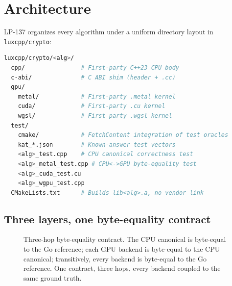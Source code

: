 \section{Architecture}
\label{sec:architecture}

LP-137 organizes every algorithm under a uniform directory layout in \texttt{luxcpp/crypto}:

\begin{lstlisting}[language=bash,caption={Per-algorithm directory layout}]
luxcpp/crypto/<alg>/
  cpp/                # First-party C++23 CPU body
  c-abi/              # C ABI shim (header + .cc)
  gpu/
    metal/            # First-party .metal kernel
    cuda/             # First-party .cu kernel
    wgsl/             # First-party .wgsl kernel
  test/
    cmake/            # FetchContent integration of test oracles
    kat_*.json        # Known-answer test vectors
    <alg>_test.cpp    # CPU canonical correctness test
    <alg>_metal_test.cpp # CPU<->GPU byte-equality test
    <alg>_cuda_test.cu
    <alg>_wgpu_test.cpp
  CMakeLists.txt      # Builds lib<alg>.a, no vendor link
\end{lstlisting}

\subsection{Three layers, one byte-equality contract}

\begin{figure}[H]
\centering
{}
\caption{Three-hop byte-equality contract. The CPU canonical is byte-equal to the Go reference; each GPU backend is byte-equal to the CPU canonical; transitively, every backend is byte-equal to the Go reference. One contract, three hops, every backend coupled to the same ground truth.}
\label{fig:byte-equality}
\end{figure}


